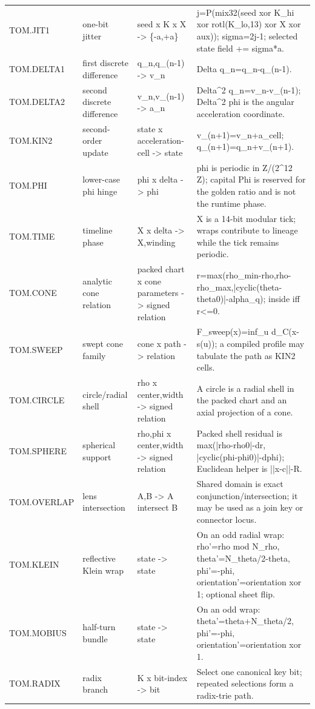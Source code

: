 \begin{longtable}{@{}L{0.18\textwidth}L{0.17\textwidth}L{0.20\textwidth}L{0.39\textwidth}@{}}
TOM.JIT1 & one-bit jitter & seed x K x X -> \{-a,+a\} & j=P(mix32(seed xor K\_hi xor rotl(K\_lo,13) xor X xor aux)); sigma=2j-1; selected state field += sigma*a. \\
TOM.DELTA1 & first discrete difference & q\_n,q\_(n-1) -> v\_n & Delta q\_n=q\_n-q\_(n-1). \\
TOM.DELTA2 & second discrete difference & v\_n,v\_(n-1) -> a\_n & Delta\textasciicircum{}2 q\_n=v\_n-v\_(n-1); Delta\textasciicircum{}2 phi is the angular acceleration coordinate. \\
TOM.KIN2 & second-order update & state x acceleration-cell -> state & v\_(n+1)=v\_n+a\_cell; q\_(n+1)=q\_n+v\_(n+1). \\
TOM.PHI & lower-case phi hinge & phi x delta -> phi & phi is periodic in Z/(2\textasciicircum{}12 Z); capital Phi is reserved for the golden ratio and is not the runtime phase. \\
TOM.TIME & timeline phase & X x delta -> X,winding & X is a 14-bit modular tick; wraps contribute to lineage while the tick remains periodic. \\
TOM.CONE & analytic cone relation & packed chart x cone parameters -> signed relation & r=max(rho\_min-rho,rho-rho\_max,|cyclic(theta-theta0)|-alpha\_q); inside iff r<=0. \\
TOM.SWEEP & swept cone family & cone x path -> relation & F\_sweep(x)=inf\_u d\_C(x-s(u)); a compiled profile may tabulate the path as KIN2 cells. \\
TOM.CIRCLE & circle/radial shell & rho x center,width -> signed relation & A circle is a radial shell in the packed chart and an axial projection of a cone. \\
TOM.SPHERE & spherical support & rho,phi x center,width -> signed relation & Packed shell residual is max(|rho-rho0|-dr, |cyclic(phi-phi0)|-dphi); Euclidean helper is ||x-c||-R. \\
TOM.OVERLAP & lens intersection & A,B -> A intersect B & Shared domain is exact conjunction/intersection; it may be used as a join key or connector locus. \\
TOM.KLEIN & reflective Klein wrap & state -> state & On an odd radial wrap: rho'=rho mod N\_rho, theta'=N\_theta/2-theta, phi'=-phi, orientation'=orientation xor 1; optional sheet flip. \\
TOM.MOBIUS & half-turn bundle & state -> state & On an odd wrap: theta'=theta+N\_theta/2, phi'=-phi, orientation'=orientation xor 1. \\
TOM.RADIX & radix branch & K x bit-index -> bit & Select one canonical key bit; repeated selections form a radix-trie path. \\

\end{longtable}
